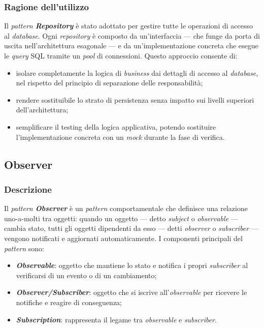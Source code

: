 \subsubsection{Ragione dell'utilizzo}
Il \textit{pattern \textbf{Repository}} è stato adottato per gestire tutte le operazioni di accesso al 
\textit{database}. Ogni \textit{repository} è composto da un'interfaccia — che funge da porta di uscita 
nell'architettura esagonale — e da un'implementazione concreta che esegue le \textit{query} SQL 
tramite un \textit{pool} di connessioni. Questo approccio consente di:
\begin{itemize}
    \item isolare completamente la logica di \textit{business} dai dettagli di accesso al \textit{database}, 
    nel rispetto del principio di separazione delle responsabilità;
    \item rendere sostituibile lo strato di persistenza senza impatto sui livelli superiori 
    dell'architettura;
    \item semplificare il testing della logica applicativa, potendo sostituire l'implementazione 
    concreta con un \textit{mock} durante la fase di verifica.
\end{itemize}

\subsection{Observer}

\subsubsection{Descrizione}
Il \textit{pattern \textbf{Observer}} è un \textit{pattern} comportamentale che definisce una relazione 
uno-a-molti tra oggetti: quando un oggetto — detto \textit{subject} o \textit{observable} — cambia 
stato, tutti gli oggetti dipendenti da esso — detti \textit{observer} o \textit{subscriber} — vengono 
notificati e aggiornati automaticamente. I componenti principali del \textit{pattern} sono:
\begin{itemize}
    \item \textit{\textbf{Observable}}: oggetto che mantiene lo stato e notifica i propri \textit{subscriber} 
    al verificarsi di un evento o di un cambiamento;
    \item \textit{\textbf{Observer/Subscriber}}: oggetto che si iscrive all'\textit{observable} per ricevere 
    le notifiche e reagire di conseguenza;
    \item \textit{\textbf{Subscription}}: rappresenta il legame tra \textit{observable} e \textit{subscriber}.
\end{itemize}

